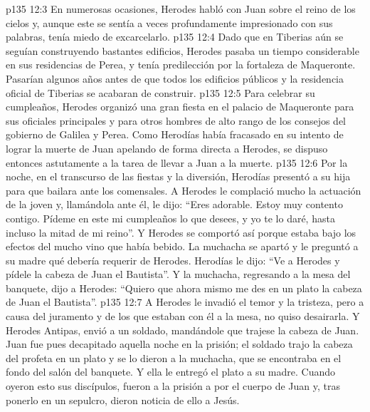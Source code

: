 \vs p135 12:3 En numerosas ocasiones, Herodes habló con Juan sobre el reino de los cielos y, aunque este se sentía a veces profundamente impresionado con sus palabras, tenía miedo de excarcelarlo.
\vs p135 12:4 Dado que en Tiberias aún se seguían construyendo bastantes edificios, Herodes pasaba un tiempo considerable en sus residencias de Perea, y tenía predilección por la fortaleza de Maqueronte. Pasarían algunos años antes de que todos los edificios públicos y la residencia oficial de Tiberias se acabaran de construir.
\vs p135 12:5 \pc Para celebrar su cumpleaños, Herodes organizó una gran fiesta en el palacio de Maqueronte para sus oficiales principales y para otros hombres de alto rango de los consejos del gobierno de Galilea y Perea. Como Herodías había fracasado en su intento de lograr la muerte de Juan apelando de forma directa a Herodes, se dispuso entonces astutamente a la tarea de llevar a Juan a la muerte.
\vs p135 12:6 Por la noche, en el transcurso de las fiestas y la diversión, Herodías presentó a su hija para que bailara ante los comensales. A Herodes le complació mucho la actuación de la joven y, llamándola ante él, le dijo: “Eres adorable. Estoy muy contento contigo. Pídeme en este mi cumpleaños lo que desees, y yo te lo daré, hasta incluso la mitad de mi reino”. Y Herodes se comportó así porque estaba bajo los efectos del mucho vino que había bebido. La muchacha se apartó y le preguntó a su madre qué debería requerir de Herodes. Herodías le dijo: “Ve a Herodes y pídele la cabeza de Juan el Bautista”. Y la muchacha, regresando a la mesa del banquete, dijo a Herodes: “Quiero que ahora mismo me des en un plato la cabeza de Juan el Bautista”.
\vs p135 12:7 A Herodes le invadió el temor y la tristeza, pero a causa del juramento y de los que estaban con él a la mesa, no quiso desairarla. Y Herodes Antipas, envió a un soldado, mandándole que trajese la cabeza de Juan. Juan fue pues decapitado aquella noche en la prisión; el soldado trajo la cabeza del profeta en un plato y se lo dieron a la muchacha, que se encontraba en el fondo del salón del banquete. Y ella le entregó el plato a su madre. Cuando oyeron esto sus discípulos, fueron a la prisión a por el cuerpo de Juan y, tras ponerlo en un sepulcro, dieron noticia de ello a Jesús.
